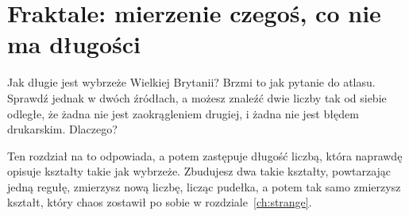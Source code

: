 
\chapter{Fraktale: mierzenie czegoś, co nie ma długości}
\label{ch:fractals}

\noindent
Jak długie jest wybrzeże Wielkiej Brytanii? Brzmi to jak pytanie do atlasu.
Sprawdź jednak w dwóch źródłach, a możesz znaleźć dwie liczby tak od siebie
odległe, że żadna nie jest zaokrągleniem drugiej, i żadna nie jest błędem
drukarskim. Dlaczego?

Ten rozdział na to odpowiada, a potem zastępuje długość liczbą, która
naprawdę opisuje kształty takie jak wybrzeże. Zbudujesz dwa takie kształty,
powtarzając jedną regułę, zmierzysz nową liczbę, licząc pudełka, a potem tak
samo zmierzysz kształt, który chaos zostawił po sobie w
rozdziale~\ref{ch:strange}.

\begin{outcomes}
\end{outcomes}


